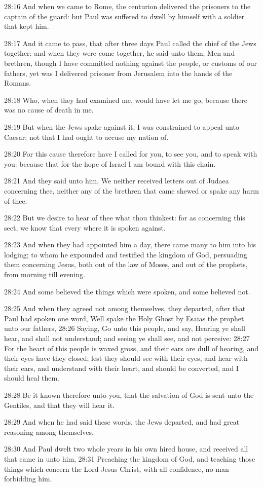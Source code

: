 28:16 And when we came to Rome, the centurion delivered the prisoners to the captain of the guard: but Paul was suffered to dwell by himself with a soldier that kept him.

28:17 And it came to pass, that after three days Paul called the chief of the Jews together: and when they were come together, he said unto them, Men and brethren, though I have committed nothing against the people, or customs of our fathers, yet was I delivered prisoner from Jerusalem into the hands of the Romans.

28:18 Who, when they had examined me, would have let me go, because there was no cause of death in me.

28:19 But when the Jews spake against it, I was constrained to appeal unto Caesar; not that I had ought to accuse my nation of.

28:20 For this cause therefore have I called for you, to see you, and to speak with you: because that for the hope of Israel I am bound with this chain.

28:21 And they said unto him, We neither received letters out of Judaea concerning thee, neither any of the brethren that came shewed or spake any harm of thee.

28:22 But we desire to hear of thee what thou thinkest: for as concerning this sect, we know that every where it is spoken against.

28:23 And when they had appointed him a day, there came many to him into his lodging; to whom he expounded and testified the kingdom of God, persuading them concerning Jesus, both out of the law of Moses, and out of the prophets, from morning till evening.

28:24 And some believed the things which were spoken, and some believed not.

28:25 And when they agreed not among themselves, they departed, after that Paul had spoken one word, Well spake the Holy Ghost by Esaias the prophet unto our fathers, 28:26 Saying, Go unto this people, and say, Hearing ye shall hear, and shall not understand; and seeing ye shall see, and not perceive: 28:27 For the heart of this people is waxed gross, and their ears are dull of hearing, and their eyes have they closed; lest they should see with their eyes, and hear with their ears, and understand with their heart, and should be converted, and I should heal them.

28:28 Be it known therefore unto you, that the salvation of God is sent unto the Gentiles, and that they will hear it.

28:29 And when he had said these words, the Jews departed, and had great reasoning among themselves.

28:30 And Paul dwelt two whole years in his own hired house, and received all that came in unto him, 28:31 Preaching the kingdom of God, and teaching those things which concern the Lord Jesus Christ, with all confidence, no man forbidding him.

